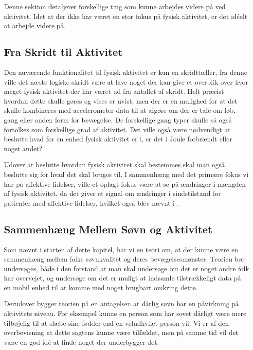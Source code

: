 Denne sektion detaljerer forskellige ting som kunne arbejdes videre på ved aktivitet.
Idet at der ikke har været en stor fokus på fysisk aktivitet, er det idéelt at arbejde videre på.

\subsection{Fra Skridt til Aktivitet}
Den nuværende funktionalitet til fysisk aktivitet er kun en skridttæller, fra denne ville det næste logiske skridt være at lave noget der kan give et overblik over hvor meget fysisk aktivitet der har været ud fra antallet af skridt.
Helt præcist hvordan dette skulle gøres og vises er uvist, men der er en mulighed for at det skulle kombineres med accelerometer data til at afgøre om der er tale om løb, gang eller anden form for bevægelse.
De forskellige gang typer skulle så også fortolkes som forskellige grad af aktivitet. 
Det ville også være nødvendigt at beslutte hvad for en enhed fysisk aktivitet er i, er det i Joule forbrændt eller noget andet?

Udover at beslutte hvordan fysisk aktivitet skal bestemmes skal man også beslutte sig for hvad det skal bruges til.
I sammenhæng med det primære fokus vi har på affektive lidelser, ville et oplagt fokus være at se på ændringer i mængden af fysisk aktivitet, da det giver et signal om ændringer i sindstilstand for patienter med affektive lidelser, hvilket også blev nævnt i \citet[Kapitel 1, Sektion 4]{misc:faellesrapp}.

\subsection{Sammenhæng Mellem Søvn og Aktivitet}
Som nævnt i starten af dette kapitel, har vi en teori om, at der kunne være en sammenhæng mellem folks søvnkvalitet og deres bevægelsesmønster.
Teorien bør undersøges, både i den forstand at man skal undersøge om det er noget andre folk har overvejet, og undersøge om det er muligt at indsamle tilstrækkeligt data på en mobil enhed til at komme med noget brugbart omkring dette.

Derudover bygger teorien på en antagelsen at dårlig søvn har en påvirkning på aktivitets niveau.
For eksempel kunne en person som har sovet dårligt være mere tilbøjelig til at slæbe sine fødder end en veludhvilet person vil.
Vi er af den overbevisning at dette sagtens kunne være tilfældet, men på samme tid vil det være en god idé at finde noget der underbygger det.

